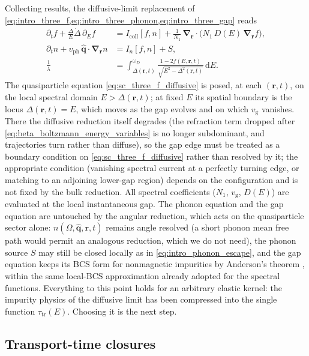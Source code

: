 \documentclass[
  aps,
  prb,
  preprint,
  superscriptaddress,
  longbibliography,
  nofootinbib
]{revtex4-2}
\newcommand{\dd}{\mathrm{d}}
\newcommand{\br}{\mathbf{r}}
\newcommand{\bnabla}{\boldsymbol{\nabla}}
\newcommand{\vg}{v_{\mathrm{g}}}
\newcommand{\tautr}{\tau_{\mathrm{tr}}}
\newcommand{\DOS}{N_1}
\newcommand{\DE}{D(E)}
\newcommand{\Icoll}{I_{\mathrm{coll}}}
\begin{document}
Collecting results, the diffusive-limit replacement of
\cref{eq:intro_three_f,eq:intro_three_phonon,eq:intro_three_gap} reads
\begin{align}
  \partial_t f
  + \frac{\Delta}{E}\dot{\Delta}\,\partial_E f
  &=
  \Icoll[f,n]
  +
  \frac{1}{\DOS}\,
  \bnabla_{\br}\!\cdot\!
  \bigl(
    \DOS\,\DE\,\bnabla_{\br} f
  \bigr),
  \label{eq:sc_three_f_diffusive}
  \\
  \partial_t n
  +
  v_{\mathrm{ph}}\,\hat{\mathbf{q}}\cdot\bnabla_{\br} n
  &=
  I_{n}[f,n]
  +
  S,
  \label{eq:sc_three_phonon_diffusive}
  \\
  \frac{1}{\lambda}
  &=
  \int_{\Delta(\br,t)}^{\omega_D}
  \frac{1-2f(E,\br,t)}{\sqrt{E^{2}-\Delta^{2}(\br,t)}}\,
  \dd E.
  \label{eq:sc_three_gap_diffusive}
\end{align}
The quasiparticle equation \cref{eq:sc_three_f_diffusive} is posed, at each
\((\br,t)\), on the local spectral domain \(E>\Delta(\br,t)\); at fixed
\(E\) its spatial boundary is the locus \(\Delta(\br,t)=E\), which moves as
the gap evolves and on which \(\vg\) vanishes. There the diffusive
reduction itself degrades (the refraction term dropped after
\cref{eq:beta_boltzmann_energy_variables} is no longer subdominant, and trajectories turn
rather than diffuse), so the gap edge must be treated as a boundary
condition on \cref{eq:sc_three_f_diffusive} rather than resolved by
it; the appropriate condition (vanishing spectral current at a
perfectly turning edge, or matching to an adjoining lower-gap region)
depends on the configuration and is not fixed by the bulk reduction.
All spectral
coefficients (\(\DOS\), \(\vg\), \(\DE\)) are evaluated at the local
instantaneous gap. The phonon equation and the gap equation are untouched by
the angular reduction, which acts on the quasiparticle sector alone:
\(n(\Omega,\hat{\mathbf{q}},\br,t)\) remains angle resolved (a short
phonon mean free path would permit an analogous reduction, which we do
not need), the phonon source \(S\) may still be closed locally as in
\cref{eq:intro_phonon_escape}, and the gap equation keeps its BCS form for
nonmagnetic impurities by Anderson's theorem \cite{anderson1959},
within the same local-BCS approximation already adopted for the
spectral functions. Everything to this point holds for an arbitrary elastic
kernel: the impurity physics of the diffusive limit has been compressed into
the single function \(\tautr(E)\). Choosing it is the next step.

\subsection{Transport-time closures}
\label{sec:sc_transport_closures}
\end{document}
